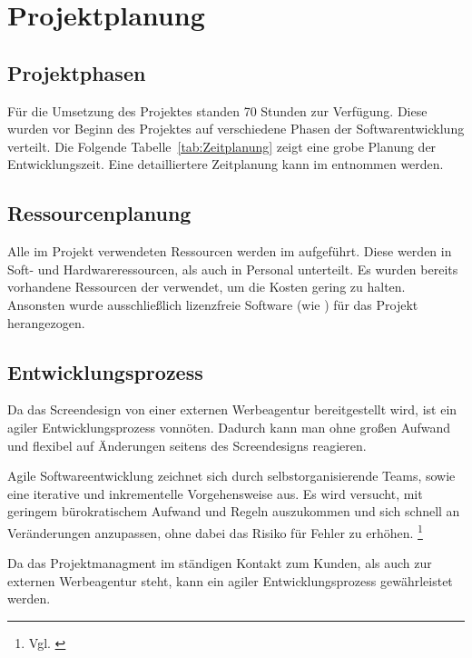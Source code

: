 \section{Projektplanung} 
\label{sec:Projektplanung}

\subsection{Projektphasen}
\label{sec:Projektphasen}

Für die Umsetzung des Projektes standen 70 Stunden zur Verfügung. Diese wurden vor
Beginn des Projektes auf verschiedene Phasen der Softwarentwicklung verteilt.
Die Folgende Tabelle~\ref{tab:Zeitplanung} zeigt eine grobe Planung
der Entwicklungszeit.
Eine detailliertere Zeitplanung kann im  entnommen werden.


\subsection{Ressourcenplanung}
\label{sec:Ressourcenplanung}
Alle im Projekt verwendeten Ressourcen werden im 
aufgeführt. Diese werden in Soft- und Hardwareressourcen, als auch in Personal
unterteilt. Es wurden bereits vorhandene Ressourcen der \mh verwendet, um die
Kosten gering zu halten. Ansonsten wurde ausschließlich lizenzfreie Software (wie \zB
{}) für das Projekt herangezogen.


\subsection{Entwicklungsprozess}
\label{sec:Entwicklungsprozess}
Da das Screendesign von einer externen Werbeagentur bereitgestellt wird, ist
ein agiler Entwicklungsprozess vonnöten. Dadurch kann man ohne großen Aufwand
und flexibel auf Änderungen seitens des Screendesigns reagieren.

Agile Softwareentwicklung zeichnet sich durch selbstorganisierende Teams, sowie eine iterative
und inkrementelle Vorgehensweise aus. Es wird versucht, mit geringem
bürokratischem Aufwand und Regeln auszukommen und sich schnell an Veränderungen anzupassen,
ohne dabei das Risiko für Fehler zu erhöhen. \footnote{Vgl. \cite{wiki:Agile_Softwareentwicklung}}

Da das Projektmanagment im ständigen Kontakt zum Kunden, als auch zur externen
Werbeagentur steht, kann ein agiler Entwicklungsprozess gewährleistet werden.
